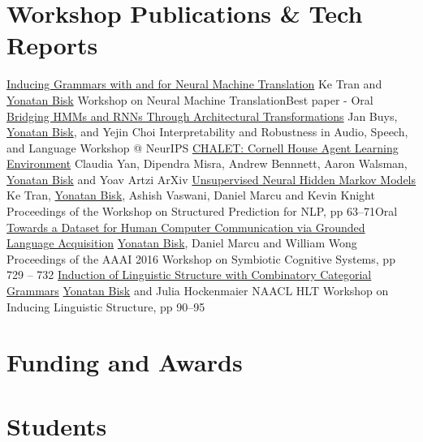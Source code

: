 \documentclass[10pt,letter]{moderncv}
\newcommand{\YB}{\underline{Yonatan Bisk}}
\begin{document}
\section{Workshop Publications \& Tech Reports}
  {\href{https://arxiv.org/abs/1805.10850}{Inducing Grammars with and for Neural Machine Translation}}
  {Ke Tran and \YB{}}
  {Workshop on Neural Machine Translation}{Best paper - Oral}{}
\pub{--}
  {\href{https://openreview.net/forum?id=rJxEso0osm}{Bridging HMMs and RNNs Through Architectural Transformations}}
  {Jan Buys, \YB{}, and Yejin Choi}
  {Interpretability and Robustness in Audio, Speech, and Language Workshop @ NeurIPS}{}{}
\pub{--}
  {\href{https://arxiv.org/abs/1801.07357}{CHALET: Cornell House Agent Learning Environment}}
  {Claudia Yan, Dipendra Misra, Andrew Bennnett, Aaron Walsman, \YB{} and Yoav Artzi}
  {ArXiv}{}{}
  {\href{http://yonatanbisk.com/papers/2016-EMNLP-StrcPred.pdf}{Unsupervised Neural Hidden Markov Models}}
  {Ke Tran, \YB{}, Ashish Vaswani, Daniel Marcu and Kevin Knight}
  {Proceedings of the Workshop on Structured Prediction for NLP, pp 63--71}{Oral}{}
\pub{--}
  {\href{http://yonatanbisk.com/papers/2016-AAAI-Wksp.pdf}{Towards a Dataset for Human Computer Communication via Grounded Language Acquisition}}
  {\YB{}, Daniel Marcu and William Wong}
  {Proceedings of the AAAI 2016 Workshop on Symbiotic Cognitive Systems, pp 729 -- 732}{}{}
  {\href{http://yonatanbisk.com/papers/2012-NAACL-WILS.pdf}{Induction of Linguistic Structure with Combinatory Categorial Grammars}}
  {\YB{} and Julia Hockenmaier}
  {NAACL HLT Workshop on Inducing Linguistic Structure, pp 90--95}{}{}


\section{Funding and Awards}

\section{Students}
\end{document}
